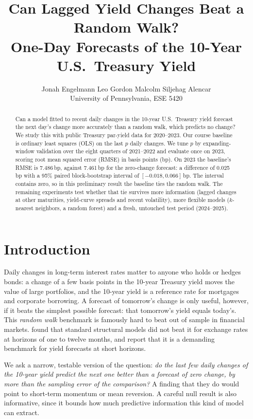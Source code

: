\documentclass{article}
\title{Can Lagged Yield Changes Beat a Random Walk?\\
One-Day Forecasts of the 10-Year U.S.\ Treasury Yield}
\author{%
  Jonah Engelmann \qquad Leo Gordon \qquad Malcolm Siljehag Alencar \\
  \textmd{University of Pennsylvania, ESE 5420}
}
\begin{document}
\maketitle

\begin{abstract}
Can a model fitted to recent daily changes in the 10-year U.S.\ Treasury yield forecast the next day's change more accurately than a random walk, which predicts no change? We study this with public Treasury par-yield data for 2020--2023. Our course baseline is ordinary least squares (OLS) on the last $p$ daily changes. We tune $p$ by expanding-window validation over the eight quarters of 2021--2022 and evaluate once on 2023, scoring root mean squared error (RMSE) in basis points (bp). On 2023 the baseline's RMSE is 7.486\,bp, against 7.461\,bp for the zero-change forecast: a difference of 0.025\,bp with a 95\% paired block-bootstrap interval of $[-0.018, 0.066]$\,bp. The interval contains zero, so in this preliminary result the baseline ties the random walk. The remaining experiments test whether that tie survives more information (lagged changes at other maturities, yield-curve spreads and recent volatility), more flexible models ($k$-nearest neighbors, a random forest) and a fresh, untouched test period (2024--2025).
\end{abstract}

\section{Introduction}
Daily changes in long-term interest rates matter to anyone who holds or hedges bonds: a change of a few basis points in the 10-year Treasury yield moves the value of large portfolios, and the 10-year yield is a reference rate for mortgages and corporate borrowing. A forecast of tomorrow's change is only useful, however, if it beats the simplest possible forecast: that tomorrow's yield equals today's. This \emph{random walk} benchmark is famously hard to beat out of sample in financial markets. \citet{meese1983} found that standard structural models did not beat it for exchange rates at horizons of one to twelve months, and \citet{diebold2006} report that it is a demanding benchmark for yield forecasts at short horizons.

We ask a narrow, testable version of the question: \emph{do the last few daily changes of the 10-year yield predict the next one better than a forecast of zero change, by more than the sampling error of the comparison?} A finding that they do would point to short-term momentum or mean reversion. A careful null result is also informative, since it bounds how much predictive information this kind of model can extract.
\end{document}
